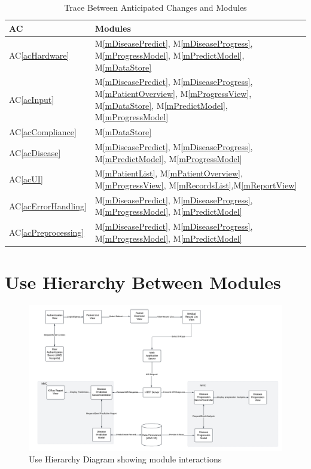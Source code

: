 \documentclass[12pt, titlepage]{article}
\newcommand{\acref}[1]{AC\ref{#1}}
\newcommand{\mref}[1]{M\ref{#1}}
\begin{document}
\begin{table}[H]
\centering
\begin{tabular}{p{} p{}}
\toprule
\textbf{AC} & \textbf{Modules}\\
\midrule
\acref{acHardware} & \mref{mDiseasePredict}, \mref{mDiseaseProgress}, \mref{mProgressModel}, \mref{mPredictModel}, \mref{mDataStore}\\
\acref{acInput} & \mref{mDiseasePredict}, \mref{mDiseaseProgress}, \mref{mPatientOverview}, \mref{mProgressView}, \mref{mDataStore}, \mref{mPredictModel}, \mref{mProgressModel}\\
\acref{acCompliance} & \mref{mDataStore}\\
\acref{acDisease} & \mref{mDiseasePredict}, \mref{mDiseaseProgress}, \mref{mPredictModel}, \mref{mProgressModel}\\
\acref{acUI} & \mref{mPatientList}, \mref{mPatientOverview}, \mref{mProgressView}, \mref{mRecordsList},\mref{mReportView}\\
\acref{acErrorHandling} & \mref{mDiseasePredict}, \mref{mDiseaseProgress}, \mref{mProgressModel}, \mref{mPredictModel}\\
\acref{acPreprocessing} & \mref{mDiseasePredict}, \mref{mDiseaseProgress}, \mref{mProgressModel}, \mref{mPredictModel}\\
\bottomrule
\end{tabular}
\caption{Trace Between Anticipated Changes and Modules}
\label{TblACT}
\end{table}

\section{Use Hierarchy Between Modules} \label{SecUse}

\begin{figure}[H]
\centering
\includegraphics[width=1.1\textwidth]{../../assets/ContextDesignFlow.png}
\caption{Use Hierarchy Diagram showing module interactions}
\label{FigUH}
\end{figure}
\end{document}
